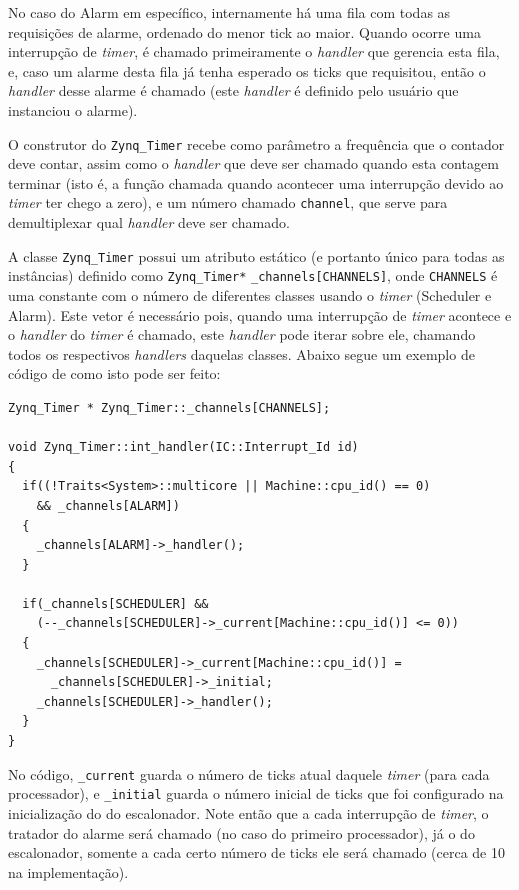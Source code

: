 No caso do Alarm em específico, internamente há uma fila com todas as requisições de alarme, ordenado do menor tick ao maior. Quando ocorre uma interrupção de \emph{timer}, é chamado primeiramente o \emph{handler} que gerencia esta fila, e, caso um alarme desta fila já tenha esperado os ticks que requisitou, então o \emph{handler} desse alarme é chamado (este \emph{handler} é definido pelo usuário que instanciou o alarme).


O construtor do \verb+Zynq_Timer+ recebe como parâmetro a frequência que o contador deve contar, assim como o \emph{handler} que deve ser chamado quando esta contagem terminar (isto é, a função chamada quando acontecer uma interrupção devido ao \emph{timer} ter chego a zero), e um número chamado \verb+channel+, que serve para demultiplexar qual \emph{handler} deve ser chamado.

A classe \verb+Zynq_Timer+ possui um atributo estático (e portanto único para todas as instâncias) definido como \verb+Zynq_Timer*+ \verb+_channels[CHANNELS]+, onde \verb+CHANNELS+ é uma constante com o número de diferentes classes usando o \emph{timer} (Scheduler e Alarm). Este vetor é necessário pois, quando uma interrupção de \emph{timer} acontece e o \emph{handler} do \emph{timer} é chamado, este \emph{handler} pode iterar sobre ele, chamando todos os respectivos \emph{handlers} daquelas classes. Abaixo segue um exemplo de código de como isto pode ser feito:


\label{int_handler}
\begin{lstlisting}
Zynq_Timer * Zynq_Timer::_channels[CHANNELS];

void Zynq_Timer::int_handler(IC::Interrupt_Id id)
{
  if((!Traits<System>::multicore || Machine::cpu_id() == 0)
    && _channels[ALARM])
  {
    _channels[ALARM]->_handler();
  }

  if(_channels[SCHEDULER] &&
    (--_channels[SCHEDULER]->_current[Machine::cpu_id()] <= 0))
  {
    _channels[SCHEDULER]->_current[Machine::cpu_id()] =
      _channels[SCHEDULER]->_initial;
    _channels[SCHEDULER]->_handler();
  }
}
\end{lstlisting}

No código, \verb+_current+ guarda o número de ticks atual daquele \emph{timer} (para cada processador), e \verb+_initial+ guarda o número inicial de ticks que foi configurado na inicialização do do escalonador. Note então que a cada interrupção de \emph{timer}, o tratador do alarme será chamado (no caso do primeiro processador), já o do escalonador, somente a cada certo número de ticks ele será chamado (cerca de 10 na implementação).


